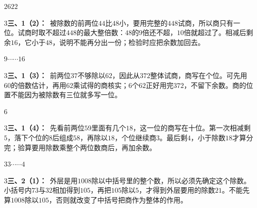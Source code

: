 \documentclass[multi=snippet,border={5bp 20bp 5bp 5bp}]{standalone}
\newenvironment{snippet}[3]{\begin{minipage}{#1bp}\color{answerred}\fontsize{#2}{#3}\selectfont\raggedright}{\end{minipage}}
\begin{document}
\begin{snippet}{27.0}{10.5}{14}\SourceSans\setlength{\mathindent}{2bp}\(2622\)\end{snippet}
\begin{snippet}{505}{11.5}{14}\begin{multicols}{3}\raggedcolumns \textbf{三、1（2）：}\ 被除数的前两位\(44\)\allowbreak 比\(48\)\allowbreak 小，要用完整的\(448\)\allowbreak 试商，所以商只有一位。试商时取不超过\(448\)\allowbreak 的最大整倍数：\(48\)\allowbreak 的\(9\)\allowbreak 倍还不超，\(10\)\allowbreak 倍就超过了。相减后剩余\(16\)\allowbreak ，它小于\(48\)\allowbreak ，说明不能再分出一份；检验时应把余数加回去。\end{multicols}\end{snippet}
\begin{snippet}{47.0}{10.5}{14}\SourceSans\setlength{\mathindent}{2bp}\(9\cdots\cdots16\)\end{snippet}
\begin{snippet}{505}{11.5}{14}\begin{multicols}{3}\raggedcolumns \textbf{三、1（3）：}\ 前两位\(37\)\allowbreak 不够除以\(62\)\allowbreak ，因此从\(372\)\allowbreak 整体试商，商写在个位。可先用\(60\)\allowbreak 的倍数估计，再用\(62\)\allowbreak 乘试得的商核实；\(6\)\allowbreak 个\(62\)\allowbreak 正好用完\(372\)\allowbreak ，不留下余数。商的位置不能因为被除数有三位就多写一位。\end{multicols}\end{snippet}
\begin{snippet}{15.0}{10.5}{14}\SourceSans\setlength{\mathindent}{2bp}\(6\)\end{snippet}
\begin{snippet}{505}{11.5}{14}\begin{multicols}{3}\raggedcolumns \textbf{三、1（4）：}\ 先看前两位\(59\)\allowbreak 里面有几个\(18\)\allowbreak ，这一位的商写在十位。第一次相减剩\(5\)\allowbreak ，落下个位的\(8\)\allowbreak 后组成\(58\)\allowbreak ，再除以\(18\)\allowbreak ，个位继续商\(3\)\allowbreak 。最后剩\(4\)\allowbreak ，小于除数\(18\)\allowbreak 才算分完；验算要用除数乘整个两位数商后，再加余数。\end{multicols}\end{snippet}
\begin{snippet}{47.0}{10.5}{14}\SourceSans\setlength{\mathindent}{2bp}\(33\cdots\cdots4\)\end{snippet}
\begin{snippet}{505}{11.5}{14}\begin{multicols}{3}\raggedcolumns \textbf{三、2（1）：}\ 外层是用\(1008\)\allowbreak 除以中括号里的整个数，所以必须先确定这个除数。小括号内\(73\)\allowbreak 与\(32\)\allowbreak 相加得到\(105\)\allowbreak ，再把\(105\)\allowbreak 除以\(5\)\allowbreak ，才得到外层要用的除数\(21\)\allowbreak 。不能先算\(1008\)\allowbreak 除以\(105\)\allowbreak ，否则就改变了中括号把商作为整体的作用。\end{multicols}\end{snippet}
\end{document}
